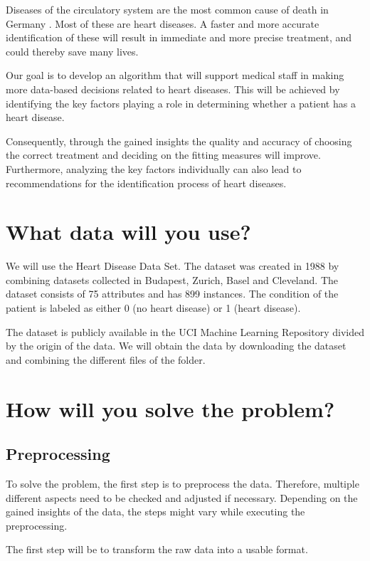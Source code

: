 \documentclass[11pt,titlepage,oneside,openany]{book}
\begin{document}
Diseases of the circulatory system are the most common cause of death in Germany \citep{statistischesbundesamt2022}. 
Most of these are heart diseases. A faster and more accurate identification of these will result in immediate and more precise treatment, and could thereby save many lives.

Our goal is to develop an algorithm that will support medical staff in making more data-based decisions related to heart diseases. This will be achieved by identifying the key factors playing a role in determining whether a patient has a heart disease. 

Consequently, through the gained insights the quality and accuracy of choosing the correct treatment and deciding on the fitting measures will improve. Furthermore, analyzing the key factors individually can also lead to recommendations for the identification process of heart diseases. 


\section{What data will you use?}
\label{sec:data}

We will use the Heart Disease Data Set. The dataset was created in 1988 by combining datasets collected in Budapest, Zurich, Basel and Cleveland. The dataset consists of 75 attributes and has 899 instances. The condition of the patient is labeled as either 0 (no heart disease) or 1 (heart disease).

The dataset is publicly available in the UCI Machine Learning Repository \citep{janosi1988} divided by the origin of the data. We will obtain the data by downloading the dataset and combining the different files of the folder.

\section{How will you solve the problem?}
\label{cha:solve}

\subsection{Preprocessing}
To solve the problem, the first step is to preprocess the data. Therefore, multiple different aspects need to be checked and adjusted if necessary. Depending on the gained insights of the data, the steps might vary while executing the preprocessing. 

The first step will be to transform the raw data into a usable format.
\end{document}
